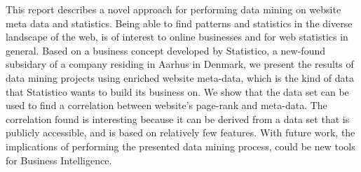 
This report describes a novel approach for performing data mining on website meta data and statistics. Being able to find patterns and statistics in the diverse landscape of the web, is of interest to online businesses and for web statistics in general. Based on a business concept developed by Statistico, a new-found subsidary of a company residing in Aarhus in Denmark, we present the results of data mining projects using enriched website meta-data, which is the kind of data that Statistico wants to build its business on. We show that the data set can be used to find a correlation between website's page-rank and meta-data. The correlation found is interesting because it can be derived from a data set that is publicly accessible, and is based on relatively few features. With future work, the implications of performing the presented data mining process, could be new tools for Business Intelligence.